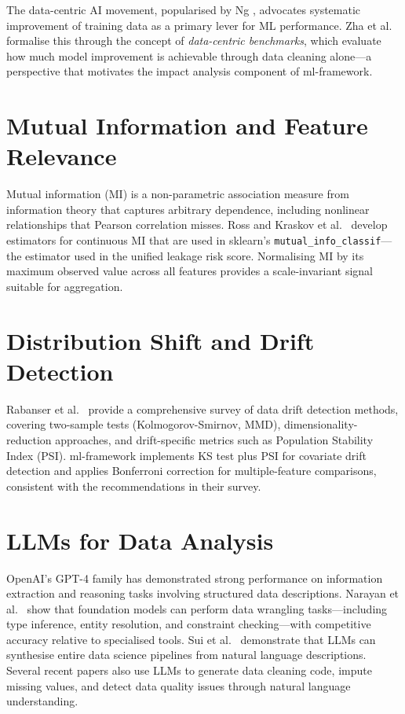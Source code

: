\documentclass[12pt,a4paper]{report}
\begin{document}
The data-centric AI movement, popularised by Ng \cite{ng2021}, advocates systematic
improvement of training data as a primary lever for ML performance.  Zha et al.\
\cite{zha2023} formalise this through the concept of \emph{data-centric benchmarks}, which
evaluate how much model improvement is achievable through data cleaning alone---a
perspective that motivates the impact analysis component of ml-framework.

\section{Mutual Information and Feature Relevance}

Mutual information (MI) is a non-parametric association measure from information theory
that captures arbitrary dependence, including nonlinear relationships that Pearson correlation
misses.  Ross \cite{ross2014} and Kraskov et al.\ \cite{kraskov2004} develop estimators for
continuous MI that are used in sklearn's \texttt{mutual\_info\_classif}---the estimator used
in the unified leakage risk score.  Normalising MI by its maximum observed value across
all features provides a scale-invariant signal suitable for aggregation.

\section{Distribution Shift and Drift Detection}

Rabanser et al.\ \cite{rabanser2019} provide a comprehensive survey of data drift detection
methods, covering two-sample tests (Kolmogorov-Smirnov, MMD), dimensionality-reduction
approaches, and drift-specific metrics such as Population Stability Index (PSI).
ml-framework implements KS test plus PSI for covariate drift detection and applies
Bonferroni correction for multiple-feature comparisons, consistent with the recommendations
in their survey.

\section{LLMs for Data Analysis}

OpenAI's GPT-4 family \cite{openai2023} has demonstrated strong performance on information
extraction and reasoning tasks involving structured data descriptions.  Narayan et al.\
\cite{narayan2022} show that foundation models can perform data wrangling tasks---including
type inference, entity resolution, and constraint checking---with competitive accuracy
relative to specialised tools.  Sui et al.\ \cite{sui2023} demonstrate that LLMs can
synthesise entire data science pipelines from natural language descriptions.  Several
recent papers also use LLMs to generate data cleaning code, impute missing values, and
detect data quality issues through natural language understanding.
\end{document}

